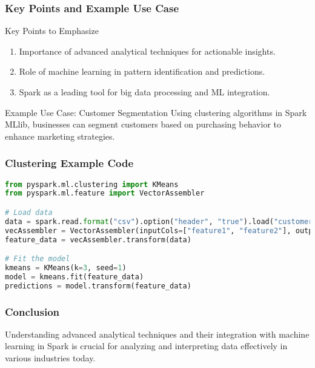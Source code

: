 \documentclass[aspectratio=169]{beamer}
\begin{document}
\begin{frame}[fragile]
    \frametitle{Key Points and Example Use Case}
    
    \begin{block}{Key Points to Emphasize}
        \begin{enumerate}
            \item Importance of advanced analytical techniques for actionable insights.
            \item Role of machine learning in pattern identification and predictions.
            \item Spark as a leading tool for big data processing and ML integration.
        \end{enumerate}
    \end{block}
    
    \begin{block}{Example Use Case: Customer Segmentation}
        Using clustering algorithms in Spark MLlib, businesses can segment customers based on purchasing behavior to enhance marketing strategies.
    \end{block}
\end{frame}

\begin{frame}[fragile]
    \frametitle{Clustering Example Code}
    
    \begin{lstlisting}[language=Python, caption={Sample code for clustering with KMeans}]
from pyspark.ml.clustering import KMeans
from pyspark.ml.feature import VectorAssembler

# Load data
data = spark.read.format("csv").option("header", "true").load("customer_data.csv")
vecAssembler = VectorAssembler(inputCols=["feature1", "feature2"], outputCol="features")
feature_data = vecAssembler.transform(data)

# Fit the model
kmeans = KMeans(k=3, seed=1)
model = kmeans.fit(feature_data)
predictions = model.transform(feature_data)
    \end{lstlisting}
\end{frame}

\begin{frame}[fragile]
    \frametitle{Conclusion}
    
    Understanding advanced analytical techniques and their integration with machine learning in Spark is crucial for analyzing and interpreting data effectively in various industries today.
\end{frame}
\end{document}
